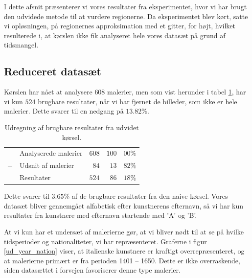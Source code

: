 {
{\sffamily I dette afsnit præsenterer vi vores resultater fra
eksperimentet, hvor vi har brugt den udvidede metode til at vurdere
regionerne. Da eksperimentet blev kørt, satte vi opløsningen, på
regionernes approksimation med et gitter, for højt, hvilket resulterede
i, at kørslen ikke fik analyseret hele vores datasæt på grund af
tidsmangel.
}

\subsection{Reduceret datasæt}
Kørslen har nået at analysere $608$ malerier, men som vist herunder i
tabel \ref{ud_tabel_fjern_detaljer}, har vi kun $524$ brugbare
resultater, når vi har fjernet de billeder, som ikke er hele malerier.
Dette svarer til en nedgang på $13.82\%$.

\begin{table}[H]
    \centering
    \begin{tabular}{r@{\ \ }p{12em}r|r@{.}l}
            & Analyserede malerier & $608$ & $100$ & $00\%$   \\
        $-$ & Udsnit af malerier   &  $84$ &  $13$ & $82\%$   \\\hline
            & Resultater           & $524$ &  $86$ & $18\%$
    \end{tabular}
    \caption[]{Udregning af brugbare resultater fra udvidet kørsel.}
    \label{ud_tabel_fjern_detaljer}
\end{table}

Dette svarer til $3.65\%$ af de brugbare resultater fra den
naive kørsel. Vores datasæt bliver gennemgået alfabetisk efter
kunstnerens efternavn, så vi har kun resultater fra kunstnere med
efternavn startende med 'A' og 'B'.

At vi kun har et undersæt af malerierne gør, at vi bliver nødt til at se
på hvilke tidsperioder og nationaliteter, vi har repræsenteret. Graferne
i figur \ref{ud_year_nation} viser, at italienske kunstnere er kraftigt
overrepræsenteret, og at malerierne primært er fra perioden 1401 --
1650. Dette er ikke overraskende, siden datasættet i forvejen
favoriserer denne type malerier.

}
